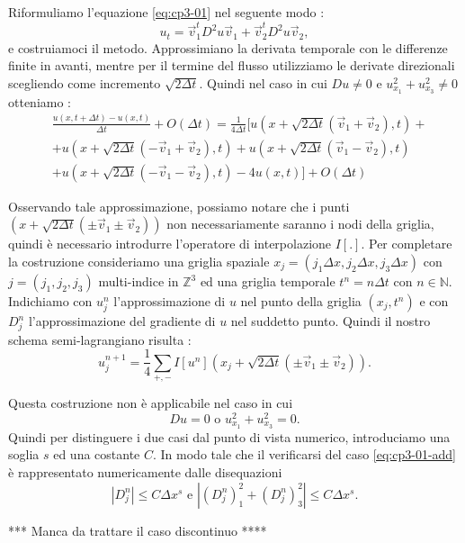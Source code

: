 Riformuliamo l'equazione \eqref{eq:cp3-01} nel seguente modo :
\begin{equation}
u_t=\vec{v}_1^tD^2u\vec{v}_1 + \vec{v}_2^tD^2u\vec{v}_2,
\end{equation}
e costruiamoci il metodo.
Approssimiano la derivata temporale con le differenze finite in avanti, mentre per il termine del flusso utilizziamo le derivate direzionali scegliendo come incremento $\sqrt{2\Delta t}$.
Quindi nel caso in cui $Du \ne 0$ e $u_{x_1}^2+u_{x_3}^2\ne 0$ otteniamo :
\[
\begin{split}
&\frac{u(x,t+\Delta t)-u(x,t)}{\Delta t} +O(\Delta t)= \frac{1}{4\Delta t}\bigl[u(x+\sqrt{2\Delta t}(\vec{v}_1+\vec{v}_2),t) +\\
& +u(x+\sqrt{2\Delta t}(-\vec{v}_1+\vec{v}_2),t) + u(x+\sqrt{2\Delta t}(\vec{v}_1-\vec{v}_2),t) \\
& + u(x+\sqrt{2\Delta t}(-\vec{v}_1-\vec{v}_2),t) - 4u(x,t)\bigr] + O(\Delta t)
\end{split}
\]

Osservando tale approssimazione, possiamo notare che i punti  \\
$(x + \sqrt{2\Delta t}(\pm\vec{v}_1 \pm\vec{v}_2))$ non necessariamente saranno i nodi della griglia, quindi è necessario introdurre l'operatore di interpolazione $I[.]$.
Per completare la costruzione consideriamo una griglia spaziale $x_j=(j_1\Delta x,j_2\Delta x,j_3\Delta x)$ con $j=(j_1,j_2,j_3)$ multi-indice in $\mathbb{Z}^3$ ed una griglia temporale $t^n=n\Delta t$ con $n\in\mathbb{N}$.
Indichiamo con $u_j^n$ l'approssimazione di $u$ nel punto della griglia $(x_j,t^n)$ e con $D_j^n$ l'approssimazione del gradiente di $u$ nel suddetto punto. Quindi il nostro schema semi-lagrangiano risulta :
\begin{equation}
\label{eq:cp3-02}
u_j^{n+1} = \frac{1}{4}\sum_{+,-}I[u^n](x_j+\sqrt{2\Delta t}(\pm\vec{v}_1\pm\vec{v}_2)).
\end{equation} 
\begin{osservazione}
Questa costruzione non è applicabile nel caso in cui 
\begin{equation}
\label{eq:cp3-01-add}
Du = 0 \text{ o } u_{x_1}^2+u_{x_3}^2 = 0. 
\end{equation}
Quindi per distinguere i due casi dal punto di vista numerico, introduciamo una soglia $s$ ed una costante $C$. In modo tale che il verificarsi del caso \eqref{eq:cp3-01-add} è rappresentato numericamente dalle disequazioni
\[
|D_j^n|\le C\Delta x^s\text{ e }|(D_j^n)_1^2+(D_j^n)_3^2|\le C\Delta x^s.
\]
\end{osservazione}
*** Manca da trattare il caso discontinuo ****

